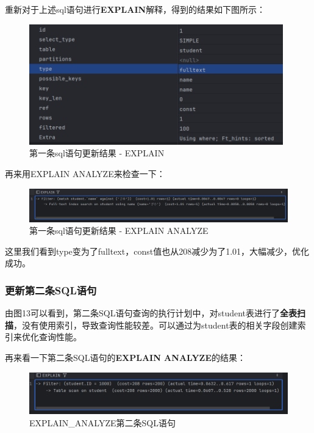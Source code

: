 \documentclass{article}
\begin{document}
	
	重新对于上述sql语句进行\textbf{EXPLAIN}解释，得到的结果如下图所示：
	
	\begin{figure}[H]
		\centering
		\includegraphics[width=11cm]{./images/17.更新结果-1-1.png}
		\caption{第一条sql语句更新结果 - EXPLAIN}
	\end{figure}
	
	再来用EXPLAIN ANALYZE来检查一下：
	
	\begin{figure}[H]
		\centering
		\includegraphics[width=15cm]{./images/18.更新结果-1-2.png}
		\caption{第一条sql语句更新结果 - EXPLAIN ANALYZE}
	\end{figure}
	
	这里我们看到type变为了fulltext，const值也从208减少为了1.01，大幅减少，优化成功。
	
	\subsubsection{更新第二条SQL语句}
	
	由图13可以看到，第二条SQL语句查询的执行计划中，对student表进行了\textbf{全表扫描}，没有使用索引，导致查询性能较差。可以通过为student表的相关字段创建索引来优化查询性能。
	
	再来看一下第二条SQL语句的\textbf{EXPLAIN ANALYZE}的结果：
	
	\begin{figure}[H]
		\centering
		\includegraphics[width=15cm]{./images/19.EXPLAIN_ANALYZE-2.png}
		\caption{EXPLAIN\_ANALYZE第二条SQL语句}
	\end{figure}
	
\end{document}
